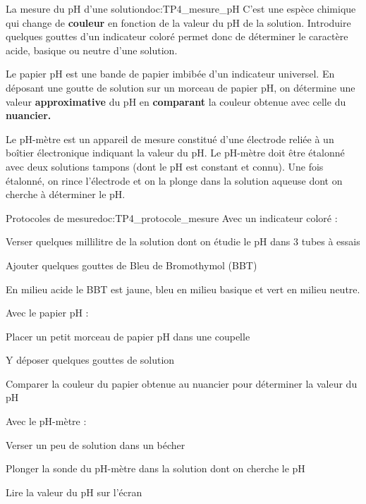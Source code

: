 \begin{doc}{La mesure du pH d'une solution}{doc:TP4_mesure_pH}
  \pointCyan {}
  C’est une espèce chimique qui change de \textbf{couleur} en fonction de la valeur du pH de la solution.
  Introduire quelques gouttes d’un indicateur coloré permet donc de déterminer le caractère acide, basique ou neutre d’une solution. \\
  \flecheLongue {}

  \pointCyan {}
  Le papier pH est une bande de papier imbibée d’un indicateur universel.
  En déposant une goutte de solution sur un morceau de papier pH, on détermine une valeur \textbf{approximative} du pH en \textbf{comparant} la couleur obtenue avec celle du \textbf{nuancier.} \\  
  \flecheLongue {}

  \pointCyan {}
  Le pH-mètre est un appareil de mesure constitué d’une électrode reliée à un boîtier électronique indiquant la valeur du pH.
  Le pH-mètre doit être étalonné avec deux solutions tampons (dont le pH est constant et connu).
  Une fois étalonné, on rince l’électrode et on la plonge dans la solution aqueuse dont on cherche à déterminer le pH. \\
  \flecheLongue {}
\end{doc}

\begin{doc}{Protocoles de mesure}{doc:TP4_protocole_mesure}
  Avec un indicateur coloré :
  \begin{protocole}
    \item Verser quelques millilitre de la solution dont on étudie le pH dans 3 tubes à essais
    \item Ajouter quelques gouttes de Bleu de Bromothymol (BBT)
    \item En milieu acide le BBT est jaune, bleu en milieu basique et vert en milieu neutre.
  \end{protocole}
  
  Avec le papier pH :
  \begin{protocole}
    \item Placer un petit morceau de papier pH dans une coupelle
    \item Y déposer quelques gouttes de solution
    \item Comparer la couleur du papier obtenue au nuancier pour déterminer la valeur du pH
  \end{protocole}
  
  Avec le pH-mètre :
  \begin{protocole}
    \item Verser un peu de solution dans un bécher
    \item Plonger la sonde du pH-mètre dans la solution dont on cherche le pH
    \item Lire la valeur du pH sur l’écran
  \end{protocole}
\end{doc}

